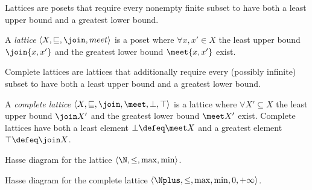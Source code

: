Lattices are posets that require every nonempty finite subset to have both a least upper bound and a greatest lower bound.

\begin{definition}[Lattice]
  A \emph{lattice} $\langle X, \sqsubseteq, \join, meet \rangle$ is a poset where $\forall x, x'\in X$ the least upper bound $\join\{x, x'\}$ and the greatest lower bound $\meet\{x, x'\}$ exist.
\end{definition}

Complete lattices are lattices that additionally require every (possibly infinite) subset to have both a least upper bound and a greatest lower bound.

\begin{definition}
  A \emph{complete lattice} $\langle X, \sqsubseteq, \join, \meet, \bot, \top \rangle$ is a lattice where $\forall X' \subseteq X$ the least upper bound $\join X'$ and the greatest lower bound $\meet X'$ exist.
  Complete lattices have both a least element $\bot \defeq \meet X$ and a greatest element $\top \defeq \join X$.
\end{definition}

\begin{marginfigure}
  \centering
  \caption{Hasse diagram for the lattice $\langle \N, \le, \max, \min \rangle$.}
  \end{marginfigure}

\begin{marginfigure}
  \centering
  \caption{Hasse diagram for the complete lattice $\langle \Nplus, \le, \max, \min, 0, +\infty \rangle$.}
  \end{marginfigure}


